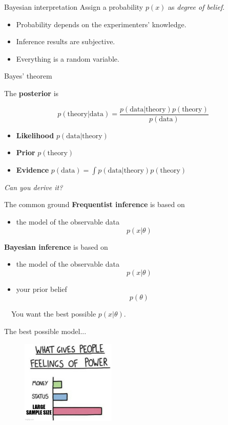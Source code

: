 \documentclass[
aspectratio=169,
14pt,
professionalfonts
]{beamer}
\newcommand{\arrow}{~\ding{220}~}
\begin{document}
\begin{frame}{Bayesian interpretation}
Assign a probability $p(x)$ as \textit{degree of belief}.

\begin{itemize}
    \item Probability depends on the experimenters' knowledge.
    \item Inference results are subjective.
    \item Everything is a random variable.
\end{itemize}
\end{frame}

\begin{frame}{Bayes' theorem}

The \textbf{posterior} is

$$p(\text{theory} | \text{data}) = \frac{p(\text{data}|\text{theory}) p(\text{theory})}{p(\text{data})}$$

\begin{itemize}
    \item \textbf{Likelihood} $p(\text{data}|\text{theory})$
    \item \textbf{Prior} $p(\text{theory})$
    \item \textbf{Evidence} $p(\text{data}) = \int p(\text{data}|\text{theory}) p(\text{theory})$
\end{itemize}
\begin{flushright}
    \textit{Can you derive it?}
\end{flushright}
\end{frame}

\begin{frame}{The common ground}
    \textbf{Frequentist inference} is based on
    \begin{itemize}
        \item the model of the observable data \textbf{$$p(x|\theta)$$}
    \end{itemize}
    \textbf{Bayesian inference} is based on
    \begin{itemize}
        \item the model of the observable data \textbf{$$p(x|\theta)$$}
        \item your prior belief $$p(\theta)$$
    \end{itemize}
    \arrow You want the best possible \textbf{$p(x|\theta)$}.
\end{frame}

\begin{frame}[noframenumbering]{The best possible model...}
    \begin{figure}
        \includegraphics[width=0.4\textwidth]{../plots/sample_size.jpg}
    \end{figure}
\end{frame}
\end{document}
